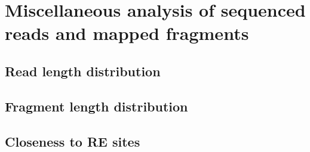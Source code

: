 \documentclass[11pt]{article}
\begin{document}
\section{Miscellaneous analysis of sequenced reads and mapped fragments}

\subsection{Read length distribution}

\subsection{Fragment length distribution}

\subsection{Closeness to RE sites}




\end{document}
